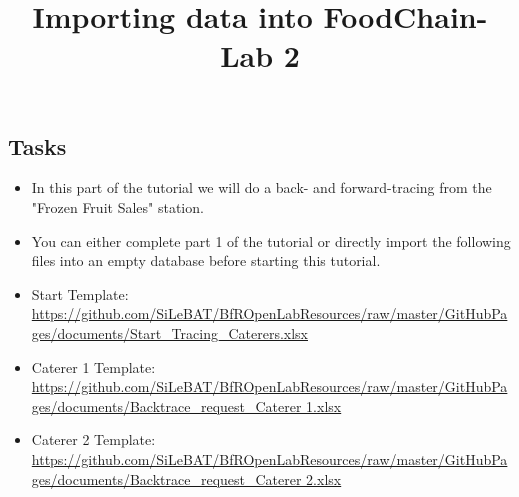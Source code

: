 \documentclass{beamer}
\title{Importing data into FoodChain-Lab 2}
\date{}
\begin{document}
\maketitle

\section{ }

\subsection{Tasks}
\begin{frame}
	\begin{itemize}
		\item In this part of the tutorial we will do a back- and forward-tracing from the "Frozen Fruit Sales" station.
		\item You can either complete part 1 of the tutorial or directly import the following files into an empty database before starting this tutorial.
		\item Start Template: \url{https://github.com/SiLeBAT/BfROpenLabResources/raw/master/GitHubPages/documents/Start_Tracing_Caterers.xlsx}
		\item Caterer 1 Template: \url{https://github.com/SiLeBAT/BfROpenLabResources/raw/master/GitHubPages/documents/Backtrace_request_Caterer 1.xlsx}
		\item Caterer 2 Template: \url{https://github.com/SiLeBAT/BfROpenLabResources/raw/master/GitHubPages/documents/Backtrace_request_Caterer 2.xlsx}
	\end{itemize}
\end{frame}
 
\end{document}
